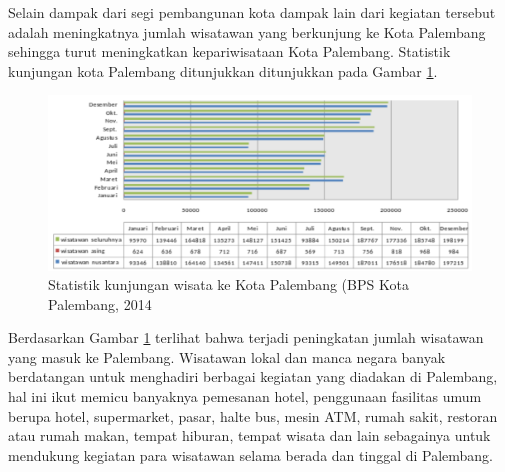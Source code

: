 Selain dampak dari segi pembangunan kota dampak lain dari kegiatan tersebut adalah meningkatnya jumlah wisatawan yang berkunjung ke Kota Palembang sehingga turut meningkatkan kepariwisataan Kota Palembang. Statistik kunjungan kota Palembang ditunjukkan ditunjukkan pada Gambar \ref{fig:bps}.\\

\begin{figure}[H]
  \centering
    \includegraphics[scale=0.41]{gambar/bps.png}
    \caption{Statistik kunjungan wisata ke Kota Palembang (BPS Kota Palembang, 2014}
    \label{fig:bps}
\end{figure}

Berdasarkan Gambar \ref{fig:bps} terlihat bahwa terjadi peningkatan jumlah wisatawan yang masuk ke Palembang. Wisatawan lokal dan manca negara banyak berdatangan untuk menghadiri berbagai kegiatan yang diadakan di Palembang, hal ini ikut memicu banyaknya pemesanan hotel, penggunaan fasilitas umum berupa hotel, supermarket, pasar, halte bus, mesin ATM, rumah sakit, restoran atau rumah makan, tempat hiburan, tempat wisata dan lain sebagainya untuk mendukung kegiatan para wisatawan selama berada dan tinggal di Palembang.\

